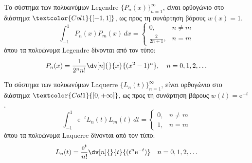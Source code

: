 \documentclass[a4paper,table]{report}
\begin{document}
\begin{prop}
  Το σύστημα των πολυωνύμων \textcolor{Col1}{Legendre} $ \{P_{n}(x)\}_{n=1}^{\infty} $, 
  είναι ορθογώνιο στο διάστημα $ \textcolor{Col1}{[-1,1]} $, ως προς τη συνάρτηση 
  βάρους $ w(x)=1 $.
  \[
    \int _{-1}^{1} P_{n}(x)P_{m}(x) \,{dx} = 
    \begin{cases}  
      0, & n \neq m \\
      \frac{2}{2n+1}, & n=m
    \end{cases}
  \] 
  όπου τα πολυώνυμα Legendre δίνονται από τον τύπο:
  \[
    P_{n}(x) = \frac{1}{2^{n} n!} \dv[n]{}{x} {(x^{2}-1)^{n}}, 
    \quad n=0,1,2,\ldots
  \]
\end{prop}

\begin{prop}
  Το σύστημα των πολυωνύμων \textcolor{Col1}{Laquerre} $ \{L_{n}(t)\}_{n=1}^{\infty} $, 
  είναι ορθογώνιο στο διάστημα $ \textcolor{Col1}{[0,+\infty]} $, ως προς τη συνάρτηση 
  βάρους $ w(t)= \mathrm{e}^{-t} $.
  \[
    \int _{-1}^{1} \mathrm{e}^{-t}  L_{n}(t)L_{m}(t) \,{dt} = 
    \begin{cases}  
      0, & n \neq m \\
      1, & n=m
    \end{cases}
  \] 
  όπου τα πολυώνυμα Laquerre δίνονται από τον τύπο:
  \[
    L_{n}(t) = \frac{\mathrm{e}^{t}}{n!} \dv[n]{}{t}{(t^{n} \mathrm{e}^{-t})}  
    \quad n=0,1,2,\ldots
  \] 
\end{prop}
\end{document}
